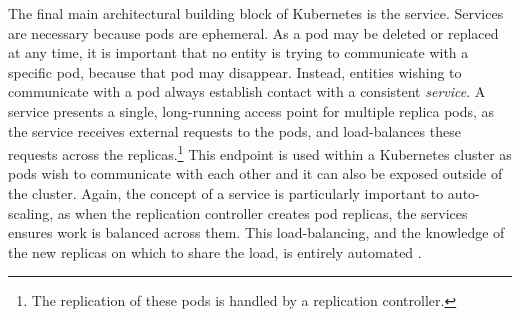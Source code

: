 The final main architectural building block of Kubernetes is the service.
Services are necessary because pods are ephemeral. As a pod may be deleted or
replaced at any time, it is important that no entity is trying to communicate
with a specific pod, because that pod may disappear. Instead, entities wishing to
communicate with a pod always establish contact with a consistent \textit{service}.
A service presents a single, long-running access point
for multiple replica pods, as the service receives
external requests to the pods, and load-balances
these requests across the replicas.\footnote{The replication of
these pods is handled by a replication controller.} This endpoint is used within
a Kubernetes cluster as pods wish to communicate with each other and it can also
be exposed outside of the cluster. Again, the concept of a service is
particularly important to auto-scaling, as when the replication
controller creates pod replicas, the services ensures work is balanced across
them. This load-balancing, and the knowledge of the new replicas on which to
share the load, is entirely automated \cite{k8s-services}.
